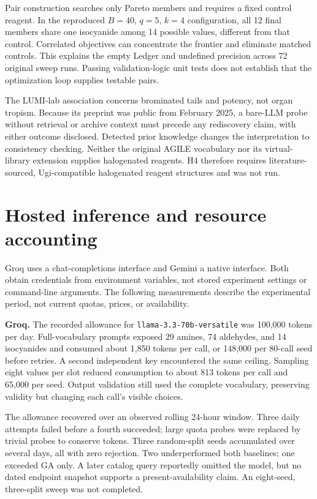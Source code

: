Pair construction searches only Pareto members and requires a fixed control reagent. In the reproduced $B=40$, $q=5$, $k=4$ configuration, all 12 final members share one isocyanide among 14 possible values, different from that control. Correlated objectives can concentrate the frontier and eliminate matched controls. This explains the empty Ledger and undefined precision across 72 original sweep runs. Passing validation-logic unit tests does not establish that the optimization loop supplies testable pairs.

The LUMI-lab association concerns brominated tails and potency, not organ tropism. Because its preprint was public from February 2025, a bare-LLM probe without retrieval or archive context must precede any rediscovery claim, with either outcome disclosed. Detected prior knowledge changes the interpretation to consistency checking. Neither the original AGILE vocabulary nor its virtual-library extension supplies halogenated reagents. H4 therefore requires literature-sourced, Ugi-compatible halogenated reagent structures and was not run.

\section{Hosted inference and resource accounting}
\label{app:hosted}
Groq uses a chat-completions interface and Gemini a native interface. Both obtain credentials from environment variables, not stored experiment settings or command-line arguments. The following measurements describe the experimental period, not current quotas, prices, or availability.

\textbf{Groq.} The recorded allowance for \texttt{llama-3.3-70b-versatile} was 100,000 tokens per day. Full-vocabulary prompts exposed 29 amines, 74 aldehydes, and 14 isocyanides and consumed about 1,850 tokens per call, or 148,000 per 80-call seed before retries. A second independent key encountered the same ceiling. Sampling eight values per slot reduced consumption to about 813 tokens per call and 65,000 per seed. Output validation still used the complete vocabulary, preserving validity but changing each call's visible choices.

The allowance recovered over an observed rolling 24-hour window. Three daily attempts failed before a fourth succeeded; large quota probes were replaced by trivial probes to conserve tokens. Three random-split seeds accumulated over several days, all with zero rejection. Two underperformed both baselines; one exceeded GA only. A later catalog query reportedly omitted the model, but no dated endpoint snapshot supports a present-availability claim. An eight-seed, three-split sweep was not completed.

